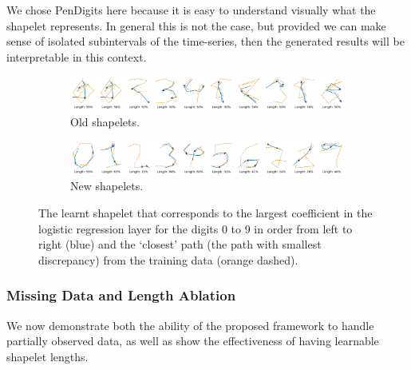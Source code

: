 We chose PenDigits here because it is easy to understand visually what the shapelet represents. In general this is not the case, but provided we can make sense of isolated subintervals of the time-series, then the generated results will be interpretable in this context.
\begin{figure}[ht]
    \begin{subfigure}[b]{\linewidth}
        \centering
        \includegraphics[width=\linewidth]{images/pendigits/old_shapelets_noborder.png}
        \caption{Old shapelets.}
        \label{fig:old_shapelets}
    \end{subfigure}
    \vspace{0.1}
    \begin{subfigure}[b]{\linewidth}
        \centering
        \includegraphics[width=\linewidth]{images/pendigits/new_shapelets_noborder.png}
        \caption{New shapelets.}
        \label{fig:new_shapelets}
    \end{subfigure}
    \caption{The learnt shapelet that corresponds to the largest coefficient in the logistic regression layer for the digits 0 to 9 in order from left to right (blue) and the `closest' path (the path with smallest discrepancy) from the training data (orange dashed).}
    \label{fig:pendigits}
\end{figure}


\subsubsection{Missing Data and Length Ablation}
We now demonstrate both the ability of the proposed framework to handle partially observed data, as well as show the effectiveness of having learnable shapelet lengths.
\begin{table}[ht]
    \caption{}
    \label{tab:uea_noise}
    \centering
    
\end{table}


